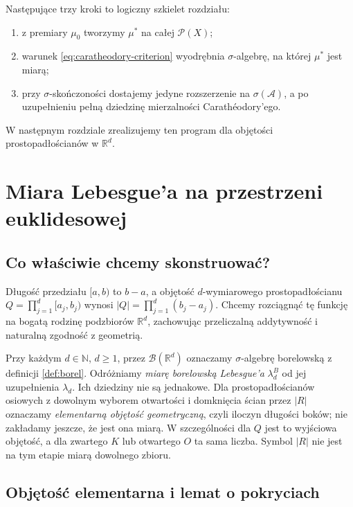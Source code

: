 \documentclass[11pt,a4paper,oneside]{book}
\numberwithin{equation}{chapter}
\theoremstyle{plain}
\theoremstyle{definition}
\theoremstyle{remark}
\begin{document}
Następujące trzy kroki to logiczny szkielet rozdziału:
\begin{enumerate}
\item z premiary $\mu_0$ tworzymy $\mu^*$ na całej $\mathcal P(X)$;
\item warunek \eqref{eq:caratheodory-criterion} wyodrębnia
$\sigma$-algebrę, na której $\mu^*$ jest miarą;
\item przy $\sigma$-skończoności dostajemy jedyne
rozszerzenie na $\sigma(\mathcal A)$, a po uzupełnieniu
pełną dziedzinę mierzalności Carathéodory'ego.
\end{enumerate}
W następnym rozdziale zrealizujemy ten program dla
objętości prostopadłościanów w $\mathbb R^d$.



\chapter{Miara Lebesgue'a na przestrzeni euklidesowej}
\label{ch:lebesgue}

\section{Co właściwie chcemy skonstruować?}

Długość przedziału $[a,b)$ to $b-a$, a objętość
$d$-wymiarowego prostopadłościanu
$Q=\prod_{j=1}^d[a_j,b_j)$ wynosi
$|Q|=\prod_{j=1}^d(b_j-a_j)$.
Chcemy rozciągnąć tę funkcję na bogatą rodzinę
podzbiorów $\mathbb R^d$, zachowując przeliczalną
addytywność i naturalną zgodność z geometrią.

Przy każdym $d\in\mathbb N$, $d\ge1$, przez
$\mathcal B(\mathbb R^d)$ oznaczamy $\sigma$-algebrę
borelowską z definicji \ref{def:borel}. Odróżniamy
\emph{miarę borelowską Lebesgue'a} $\lambda_d^B$
od jej uzupełnienia $\lambda_d$. Ich dziedziny nie są
jednakowe. Dla prostopadłościanów osiowych z dowolnym wyborem
otwartości i domknięcia ścian przez $|R|$ oznaczamy
\emph{elementarną objętość geometryczną}, czyli iloczyn
długości boków; nie zakładamy jeszcze, że jest ona miarą.
W szczególności dla $Q$ jest to wyjściowa objętość,
a dla zwartego $K$ lub otwartego $O$ ta sama liczba.
Symbol $|R|$ nie jest na tym etapie miarą dowolnego zbioru.

\section{Objętość elementarna i lemat o pokryciach}
\end{document}
